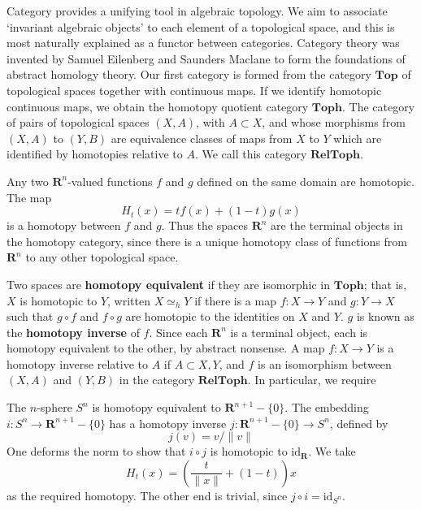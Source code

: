 Category provides a unifying tool in algebraic topology. We aim to associate `invariant algebraic objects' to each element of a topological space, and this is most naturally explained as a functor between categories. Category theory was invented by Samuel Eilenberg and Saunders Maclane to form the foundations of abstract homology theory. Our first category is formed from the category $\textbf{Top}$ of topological spaces together with continuous maps. If we identify homotopic continuous maps, we obtain the homotopy quotient category $\textbf{Toph}$. The category of pairs of topological spaces $(X,A)$, with $A \subset X$, and whose morphisms from $(X,A)$ to $(Y,B)$ are equivalence classes of maps from $X$ to $Y$ which are identified by homotopies relative to $A$. We call this category $\textbf{RelToph}$.

\begin{example}
    Any two $\mathbf{R}^n$-valued functions $f$ and $g$ defined on the same domain are homotopic. The map
    \[ H_t(x) = t f(x) + (1 - t) g(x) \]
    is a homotopy between $f$ and $g$. Thus the spaces $\mathbf{R}^n$ are the terminal objects in the homotopy category, since there is a unique homotopy class of functions from $\mathbf{R}^n$ to any other topological space.
\end{example}

Two spaces are {\bf homotopy equivalent} if they are isomorphic in $\textbf{Toph}$; that is, $X$ is homotopic to $Y$, written $X \simeq_h Y$ if there is a map $f:X \to Y$ and $g: Y \to X$ such that $g \circ f$ and $f \circ g$ are homotopic to the identities on $X$ and $Y$. $g$ is known as the {\bf homotopy inverse} of $f$. Since each $\mathbf{R}^n$ is a terminal object, each is homotopy equivalent to the other, by abstract nonsense. A map $f: X \to Y$ is a homotopy inverse relative to $A$ if $A \subset X, Y$, and $f$ is an isomorphism between $(X,A)$ and $(Y,B)$ in the category $\textbf{RelToph}$. In particular, we require

\begin{example}
    The $n$-sphere $S^n$ is homotopy equivalent to $\mathbf{R}^{n+1} - \{ 0 \}$. The embedding $i: S^n \to \mathbf{R}^{n+1} - \{ 0 \}$ has a homotopy inverse $j: \mathbf{R}^{n+1} - \{ 0 \} \to S^n$, defined by
    \[ j(v) = v/\|v\| \]
    One deforms the norm to show that $i \circ j$ is homotopic to $\text{id}_{\mathbf{R}}$. We take
    \[ H_t(x) = \left( \frac{t}{\| x \|} + (1 - t) \right) x \]
    as the required homotopy. The other end is trivial, since $j \circ i = \text{id}_{S^n}$.
\end{example}

